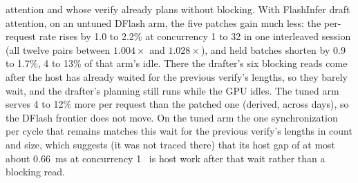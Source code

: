attention and whose verify already plans without blocking. With FlashInfer draft attention, on an untuned DFlash arm, the five patches gain much less: the per-request rate rises by 1.0 to 2.2\% at concurrency 1 to 32 in one interleaved session (all twelve pairs between $1.004\times$ and $1.028\times$), and held batches shorten by 0.9 to 1.7\%, 4 to 13\% of that arm's idle. There the drafter's six blocking reads come after the host has already waited for the previous verify's lengths, so they barely wait, and the drafter's planning still runs while the GPU idles. The tuned arm serves 4 to 12\% more per request than the patched one (derived, across days), so the DFlash frontier does not move. On the tuned arm the one synchronization per cycle that remains matches this wait for the previous verify's lengths in count and size, which suggests (it was not traced there) that its host gap of at most about 0.66~ms at concurrency 1~ is host work after that wait rather than a blocking read.

